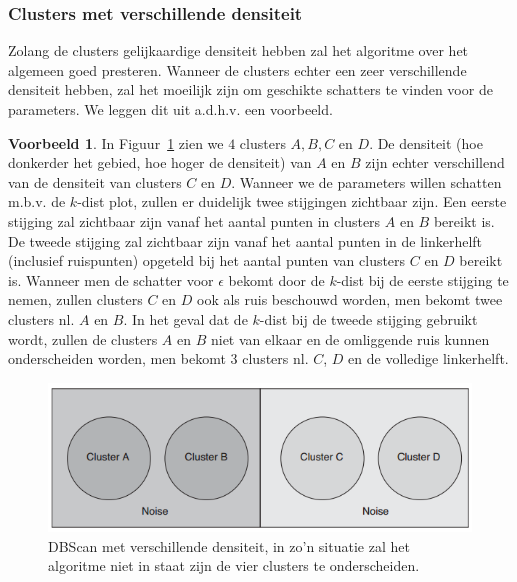 \documentclass[a4paper,12pt]{article}
\theoremstyle{definition}
\newtheorem{vb}{Voorbeeld}[subsection]
\begin{document}
\subsubsection{Clusters met verschillende densiteit}
Zolang de clusters gelijkaardige densiteit hebben zal het algoritme over het algemeen
goed presteren. Wanneer de clusters echter een zeer verschillende densiteit hebben,
zal het moeilijk zijn om geschikte schatters te vinden voor de parameters. We leggen
dit uit a.d.h.v. een voorbeeld.
\begin{vb}
In Figuur~\ref{dbscan_density} zien we $4$ clusters $A, B, C$ en $D$. De densiteit
(hoe donkerder het gebied, hoe hoger de densiteit) van $A$ en $B$ zijn echter 
verschillend van de densiteit van clusters $C$ en $D$.
Wanneer we de parameters willen schatten m.b.v. de $k$-dist plot, zullen er duidelijk
twee stijgingen zichtbaar zijn. Een eerste stijging zal zichtbaar zijn
vanaf het aantal punten in clusters $A$ en $B$ bereikt is. De tweede stijging zal
zichtbaar zijn vanaf het aantal
punten in de linkerhelft (inclusief ruispunten) opgeteld bij het aantal
punten van clusters $C$ en $D$ bereikt is. Wanneer men de schatter voor $\epsilon$ bekomt door
de $k$-dist bij de eerste stijging te nemen, zullen clusters $C$ en $D$ ook als
ruis beschouwd worden, men bekomt twee clusters nl. $A$ en $B$. In het geval dat de $k$-dist bij de tweede
stijging gebruikt wordt, zullen de clusters $A$ en $B$ niet van elkaar
en de omliggende ruis kunnen onderscheiden worden, men bekomt $3$ clusters
nl. $C$, $D$ en de volledige linkerhelft.
 \begin{figure}[!ht]
  \centering
  \includegraphics[width=15cm]{dbscan_density.png}
  \caption{DBScan met verschillende densiteit, in zo'n situatie zal het algoritme
  niet in staat zijn de vier clusters te onderscheiden.}
  \label{dbscan_density}
 \end{figure}
\end{vb}





\newpage
\end{document}
